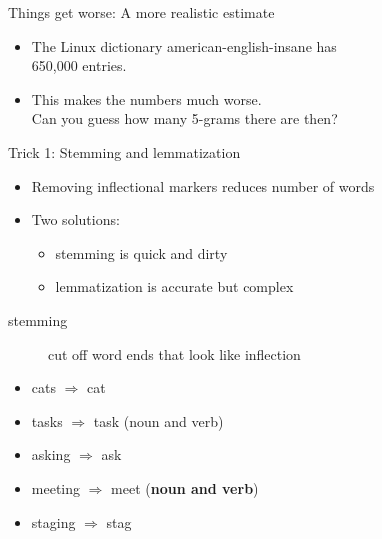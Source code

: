 \documentclass[professionalfonts, xcolor={usenames,svgnames,x11names,table}]{beamer}
\begin{document}
\begin{frame}{Things get worse: A more realistic estimate}
    \begin{itemize}
        \item The Linux dictionary american-english-insane has\\
            650,000 entries.
        \item This makes the numbers much worse.\\
            Can you guess how many 5-grams there are then?
    \end{itemize}

    \begin{center}
    \end{center}
        
    \medskip
\end{frame}

\begin{frame}{Trick 1: Stemming and lemmatization}
    \begin{itemize}
        \item Removing inflectional markers reduces number of words
        \item Two solutions:
            \begin{itemize}
                \item stemming is quick and dirty
                \item lemmatization is accurate but complex
            \end{itemize}
    \end{itemize}

    \begin{description}
        \item[stemming] cut off word ends that look like inflection
    \end{description}

    \begin{example}
        \begin{itemize}
            \item cats $\Rightarrow$ cat
            \item tasks $\Rightarrow$ task (noun and verb)
            \item asking $\Rightarrow$ ask
            \item meeting $\Rightarrow$ meet (\textbf{noun and verb})
            \item staging $\Rightarrow$ stag
        \end{itemize}
    \end{example}
\end{frame}
\end{document}
